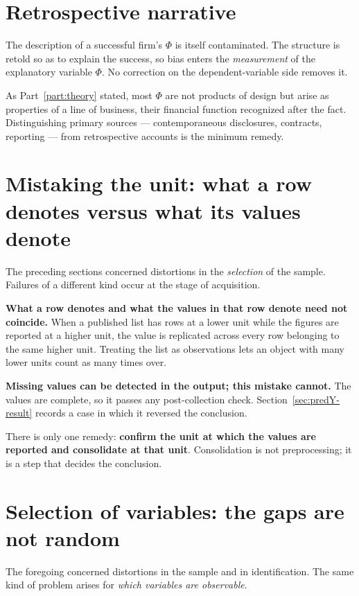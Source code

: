 \section{Retrospective narrative}
\label{sec:narrative}

The description of a successful firm's $\Phi$ is itself contaminated. The structure is
retold so as to explain the success, so bias enters the \emph{measurement} of the
explanatory variable $\Phi$. No correction on the dependent-variable side removes it.

As Part~\ref{part:theory} stated, most $\Phi$ are not products of design but arise as
properties of a line of business, their financial function recognized after the fact.
Distinguishing primary sources --- contemporaneous disclosures, contracts, reporting ---
from retrospective accounts is the minimum remedy.

\section{Mistaking the unit: what a row denotes versus what its values denote}
\label{sec:misidentification}

The preceding sections concerned distortions in the \emph{selection} of the sample. Failures
of a different kind occur at the stage of acquisition.

\textbf{What a row denotes and what the values in that row denote need not coincide.}
When a published list has rows at a lower unit while the figures are reported at a higher
unit, the value is replicated across every row belonging to the same higher unit. Treating
the list as observations lets an object with many lower units count as many times over.

\textbf{Missing values can be detected in the output; this mistake cannot.} The values are
complete, so it passes any post-collection check. Section~\ref{sec:predY-result} records a
case in which it reversed the conclusion.

There is only one remedy: \textbf{confirm the unit at which the values are reported and
consolidate at that unit}. Consolidation is not preprocessing; it is a step that decides the
conclusion.

\section{Selection of variables: the gaps are not random}
\label{sec:variable-selection}

The foregoing concerned distortions in the sample and in identification. The same kind of
problem arises for \emph{which variables are observable}.

